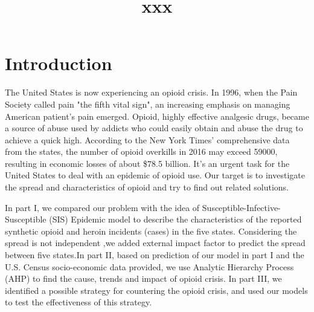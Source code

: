 \documentclass[12pt]{article}
\title{xxx}  %
\begin{document}


\section{Introduction}
The United States is now experiencing an opioid crisis. In 1996, when the Pain Society called pain "the fifth vital sign", an increasing emphasis on managing American patient's pain emerged. Opioid, highly effective analgesic drugs, became a source of abuse used by addicts who could easily obtain and abuse the drug to achieve a quick high. According to the New York Times' comprehensive data from the states, the number of opioid overkills in 2016 may exceed 59000, resulting in economic losses of about \$78.5 billion. It's an urgent task for the United States to deal with an epidemic of opioid use. Our target is to investigate the spread and characteristics of opioid and try to find out related solutions.

In part I, we compared our problem with the idea of Susceptible-Infective-Susceptible (SIS) Epidemic model to describe the characteristics of the reported synthetic opioid and heroin incidents (cases) in the five states. Considering the spread is not independent ,we added external impact factor to predict the spread between five states.In part II, based on prediction of our model in part I and the U.S. Census socio-economic data provided, we use Analytic Hierarchy Process (AHP) to find the cause, trends and impact of opioid crisis. In part III, we identified a possible strategy for countering the opioid crisis, and used our models to test the effectiveness of this strategy.


\end{document}
